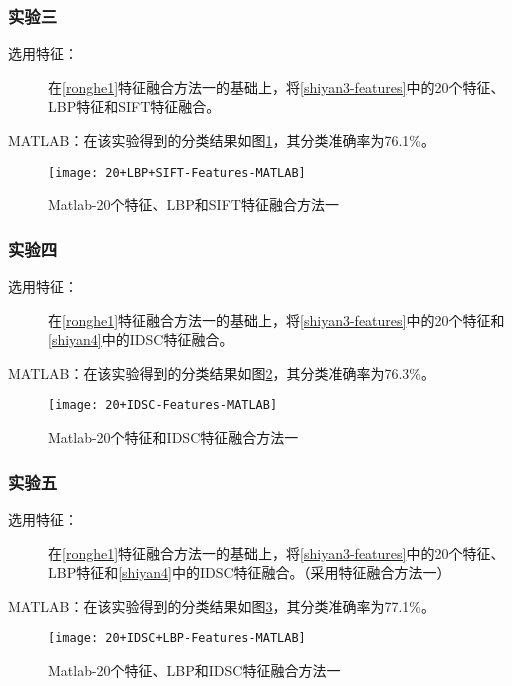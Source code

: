 \subsubsection{实验三}
\begin{description}
\item[选用特征：] 在\ref{ronghe1}特征融合方法一的基础上，将\ref{shiyan3-features}中的20个特征、LBP特征和SIFT特征融合。
\end{description}
MATLAB：在该实验得到的分类结果如图\ref{fig:20+LBP+SIFT-Features-MATLAB}，其分类准确率为76.1\%。
\begin{figure}[!ht]
\centering
\texttt{[image: 20+LBP+SIFT-Features-MATLAB]}
\caption{Matlab-20个特征、LBP和SIFT特征融合方法一}
\label{fig:20+LBP+SIFT-Features-MATLAB}
\end{figure}

\subsubsection{实验四}
\begin{description}
\item[选用特征：] 在\ref{ronghe1}特征融合方法一的基础上，将\ref{shiyan3-features}中的20个特征和\ref{shiyan4}中的IDSC特征融合。
\end{description}
MATLAB：在该实验得到的分类结果如图\ref{fig:20+IDSC-Features-MATLAB}，其分类准确率为76.3\%。
\begin{figure}[!ht]
\centering
\texttt{[image: 20+IDSC-Features-MATLAB]}
\caption{Matlab-20个特征和IDSC特征融合方法一}
\label{fig:20+IDSC-Features-MATLAB}
\end{figure}

\subsubsection{实验五}
\begin{description}
\item[选用特征：] 在\ref{ronghe1}特征融合方法一的基础上，将\ref{shiyan3-features}中的20个特征、LBP特征和\ref{shiyan4}中的IDSC特征融合。（采用特征融合方法一）
\end{description}
MATLAB：在该实验得到的分类结果如图\ref{fig:20+IDSC+LBP-Features-MATLAB}，其分类准确率为77.1\%。
\begin{figure}[!ht]
\centering
\texttt{[image: 20+IDSC+LBP-Features-MATLAB]}
\caption{Matlab-20个特征、LBP和IDSC特征融合方法一}
\label{fig:20+IDSC+LBP-Features-MATLAB}
\end{figure}



